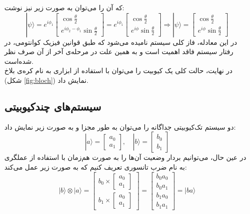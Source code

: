 که آن را می‌توان به صورت زیر نیز نوشت:
\begin{equation}
|\psi\rangle = e^{i\phi_1} \begin{bmatrix} \cos{\tfrac{\theta}{2}} \\[6pt] e^{i\phi_2-\phi_1}\sin{\tfrac{\theta}{2}} \end{bmatrix} = e^{i\phi_1} \begin{bmatrix} \cos{\tfrac{\theta}{2}} \\[6pt] e^{i\phi}\sin{\tfrac{\theta}{2}} \end{bmatrix}
\Rightarrow |\psi\rangle = \begin{bmatrix} \cos{\tfrac{\theta}{2}} \\[6pt] e^{i\phi}\sin{\tfrac{\theta}{2}} \end{bmatrix}
\end{equation}
در این معادله،
 فاز کلی سیستم نامیده می‌شود که طبق قوانین فیزیک کوانتومی، در رفتار سیستم فاقد اهمیت است و به همین علت در مرحله‌ی آخر از آن صرف نظر شده‌است. \\
در نهایت، حالت کلی یک کیوبیت را می‌توان با استفاده از ابزاری به نام کره‌ی بلاخ (شکل
\ref{fig:bloch})
نمایش داد.

\subsection{سیستم‌های چندکیوبیتی}
دو سیستم تک‌کیوبیتی جداگانه را می‌توان به طور مجزا و به صورت زیر نمایش داد:
\begin{equation}
|a\rangle = \begin{bmatrix} a_0 \\ a_1 \end{bmatrix}, \quad |b\rangle = \begin{bmatrix} b_0 \\ b_1 \end{bmatrix}
\end{equation}
در عین حال، می‌توانیم بردار وضعیت آن‌ها را به صورت هم‌زمان با استفاده از عملگری به نام ضرب تانسوری
تعریف کنیم که به صورت زیر عمل می‌کند:
\begin{equation}
|b\rangle \otimes |a\rangle = \begin{bmatrix} b_0 \times \begin{bmatrix} a_0 \\ a_1 \end{bmatrix} \\[12pt] b_1 \times \begin{bmatrix} a_0 \\ a_1 \end{bmatrix} \end{bmatrix} = \begin{bmatrix} b_0 a_0 \\[2pt] b_0 a_1 \\[2pt] b_1 a_0 \\[2pt] b_1 a_1 \end{bmatrix} = |ba\rangle
\end{equation}

